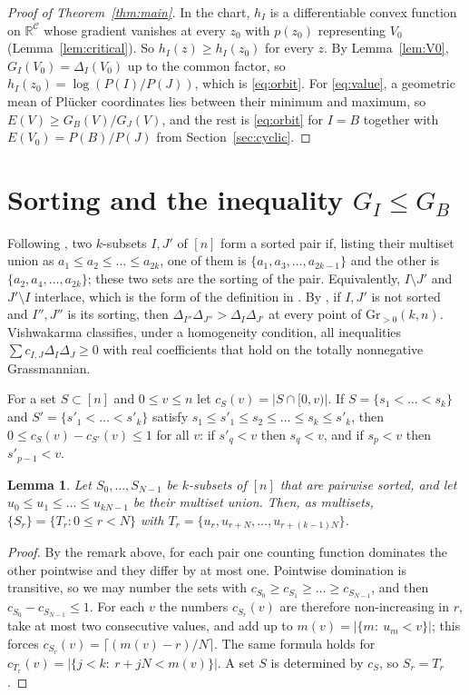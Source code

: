 \documentclass[11pt]{article}
\newtheorem{lemma}[theorem]{Lemma}
\theoremstyle{remark}
\newcommand{\Gr}{\mathrm{Gr}}
\newcommand{\R}{\mathbb{R}}
\begin{document}
\begin{proof}[Proof of Theorem~\ref{thm:main}]
In the chart, $h_I$ is a differentiable convex function on $\R^{\mathcal{C}}$ whose gradient vanishes at every $z_0$ with $p(z_0)$ representing $V_0$ (Lemma~\ref{lem:critical}). So $h_I(z)\ge h_I(z_0)$ for every $z$. By Lemma~\ref{lem:V0}, $G_I(V_0)=\Delta_I(V_0)$ up to the common factor, so $h_I(z_0)=\log(P(I)/P(J))$, which is \eqref{eq:orbit}. For \eqref{eq:value}, a geometric mean of Pl\"ucker coordinates lies between their minimum and maximum, so $E(V)\ge G_B(V)/G_J(V)$, and the rest is \eqref{eq:orbit} for $I=B$ together with $E(V_0)=P(B)/P(J)$ from Section~\ref{sec:cyclic}.
\end{proof}

\section{Sorting and the inequality \texorpdfstring{$G_I\le G_B$}{G\_I <= G\_B}}\label{sec:sort}

Following \cite{FP}, two $k$-subsets $I,J'$ of $[n]$ form a sorted pair if, listing their multiset union as $a_1\le a_2\le\dots\le a_{2k}$, one of them is $\{a_1,a_3,\dots,a_{2k-1}\}$ and the other is $\{a_2,a_4,\dots,a_{2k}\}$; these two sets are the sorting of the pair. Equivalently, $I\setminus J'$ and $J'\setminus I$ interlace, which is the form of the definition in \cite{FP}. By \cite[Corollary~6.5]{FP}, if $I,J'$ is not sorted and $I'',J''$ is its sorting, then $\Delta_{I''}\Delta_{J''}>\Delta_I\Delta_{J'}$ at every point of $\Gr_{>0}(k,n)$. Vishwakarma \cite{V} classifies, under a homogeneity condition, all inequalities $\sum c_{I,J}\Delta_I\Delta_J\ge0$ with real coefficients that hold on the totally nonnegative Grassmannian.

For a set $S\subset[n]$ and $0\le v\le n$ let $c_S(v)=|S\cap[0,v)|$. If $S=\{s_1<\dots<s_k\}$ and $S'=\{s'_1<\dots<s'_k\}$ satisfy $s_1\le s'_1\le s_2\le\dots\le s_k\le s'_k$, then $0\le c_S(v)-c_{S'}(v)\le1$ for all $v$: if $s'_q<v$ then $s_q<v$, and if $s_p<v$ then $s'_{p-1}<v$.

\begin{lemma}\label{lem:sorted}
Let $S_0,\dots,S_{N-1}$ be $k$-subsets of $[n]$ that are pairwise sorted, and let $u_0\le u_1\le\dots\le u_{kN-1}$ be their multiset union. Then, as multisets, $\{S_r\}=\{T_r:0\le r<N\}$ with $T_r=\{u_r,u_{r+N},\dots,u_{r+(k-1)N}\}$.
\end{lemma}

\begin{proof}
By the remark above, for each pair one counting function dominates the other pointwise and they differ by at most one. Pointwise domination is transitive, so we may number the sets with $c_{S_0}\ge c_{S_1}\ge\dots\ge c_{S_{N-1}}$, and then $c_{S_0}-c_{S_{N-1}}\le1$. For each $v$ the numbers $c_{S_r}(v)$ are therefore non-increasing in $r$, take at most two consecutive values, and add up to $m(v)=|\{m:\ u_m<v\}|$; this forces $c_{S_r}(v)=\lceil(m(v)-r)/N\rceil$. The same formula holds for $c_{T_r}(v)=|\{j<k:\ r+jN<m(v)\}|$. A set $S$ is determined by $c_S$, so $S_r=T_r$.
\end{proof}
\end{document}
